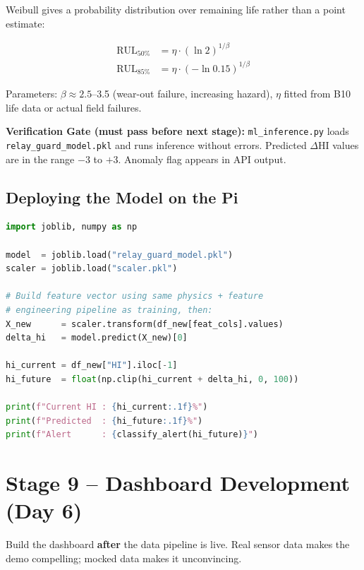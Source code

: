 \documentclass[12pt,a4paper]{article}
\newenvironment{checkgate}{%
  \begin{mdframed}[backgroundcolor=yellow!10,linecolor=orange!70,linewidth=1.5pt,
    innerleftmargin=9pt,innerrightmargin=9pt,innertopmargin=5pt,innerbottommargin=5pt]
  \textbf{\color{orange!70!black}Verification Gate (must pass before next stage): }}{\end{mdframed}}
\begin{document}
Weibull gives a probability distribution over remaining life rather than a point estimate:

\begin{align}
\text{RUL}_{50\%} &= \eta \cdot (\ln 2)^{1/\beta} \\
\text{RUL}_{85\%} &= \eta \cdot (-\ln 0.15)^{1/\beta}
\end{align}

Parameters: $\beta \approx 2.5$--3.5 (wear-out failure, increasing hazard), $\eta$ fitted from B10 life data
or actual field failures.

\begin{checkgate}
\texttt{ml\_inference.py} loads \texttt{relay\_guard\_model.pkl} and runs inference without errors.
Predicted $\Delta$HI values are in the range $-3$ to $+3$. Anomaly flag appears in API output.
\end{checkgate}

\subsection{Deploying the Model on the Pi}

\begin{lstlisting}[language=Python, caption={Inference on Raspberry Pi using saved model.}]
import joblib, numpy as np

model  = joblib.load("relay_guard_model.pkl")
scaler = joblib.load("scaler.pkl")

# Build feature vector using same physics + feature
# engineering pipeline as training, then:
X_new      = scaler.transform(df_new[feat_cols].values)
delta_hi   = model.predict(X_new)[0]

hi_current = df_new["HI"].iloc[-1]
hi_future  = float(np.clip(hi_current + delta_hi, 0, 100))

print(f"Current HI : {hi_current:.1f}%")
print(f"Predicted  : {hi_future:.1f}%")
print(f"Alert      : {classify_alert(hi_future)}")
\end{lstlisting}

\section{Stage 9 -- Dashboard Development (Day 6)}

Build the dashboard \textbf{after} the data pipeline is live. Real sensor data makes the demo compelling;
mocked data makes it unconvincing.
\end{document}
